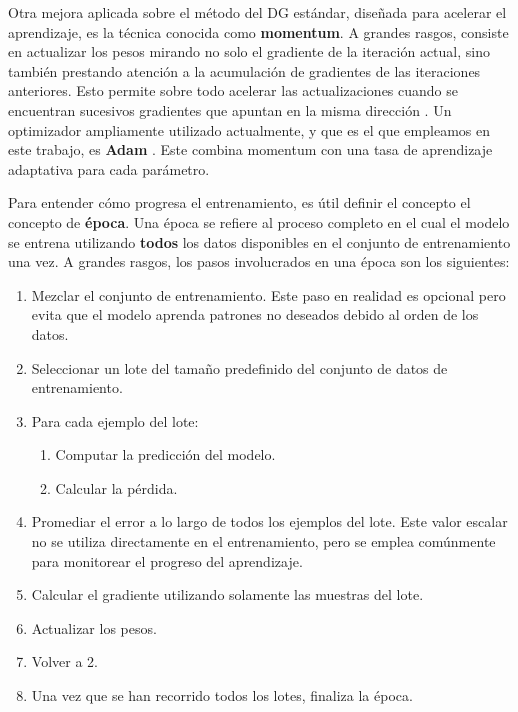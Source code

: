 \documentclass[../../main.tex]{subfiles}
\begin{document}
Otra mejora aplicada sobre el método del DG estándar, diseñada para acelerar el
aprendizaje, es la técnica conocida como \textbf{momentum}. A grandes rasgos, consiste en
actualizar los pesos mirando no solo el gradiente de la iteración actual, sino también
prestando atención a la acumulación de gradientes de las iteraciones anteriores. Esto
permite sobre todo acelerar las actualizaciones cuando se encuentran sucesivos gradientes
que apuntan en la misma dirección \cite{deep-learning}. Un optimizador ampliamente
utilizado actualmente, y que es el que empleamos en este trabajo, es \textbf{Adam}
\cite{adampaper}. Este combina momentum con una tasa de aprendizaje adaptativa para cada
parámetro.

Para entender cómo progresa el entrenamiento, es útil definir el concepto el concepto de
\textbf{época}. Una época se refiere al proceso completo en el cual el modelo se entrena
utilizando \textbf{todos} los datos disponibles en el conjunto de entrenamiento una vez. A
grandes rasgos, los pasos involucrados en una época son los siguientes:
\begin{enumerate}[itemsep=0.05cm,label=\textbf{\arabic*.}]
    \item Mezclar el conjunto de entrenamiento. Este paso en realidad es opcional
    pero evita que el modelo aprenda patrones no deseados debido al orden de los datos.
    \item Seleccionar un lote del tamaño predefinido del conjunto de datos de entrenamiento.
    \item Para cada ejemplo del lote:
    \vspace{-0.2cm}
    \begin{enumerate}[noitemsep]
        \item Computar la predicción del modelo.
        \item Calcular la pérdida.
    \end{enumerate}
    \item Promediar el error a lo largo de todos los ejemplos del lote. Este valor escalar
    no se utiliza directamente en el entrenamiento, pero se emplea comúnmente para
    monitorear el progreso del aprendizaje.
    \item Calcular el gradiente utilizando solamente las muestras del lote.
    \item Actualizar los pesos.
    \item Volver a 2.
    \item Una vez que se han recorrido todos los lotes, finaliza la época.
\end{enumerate}
\end{document}
